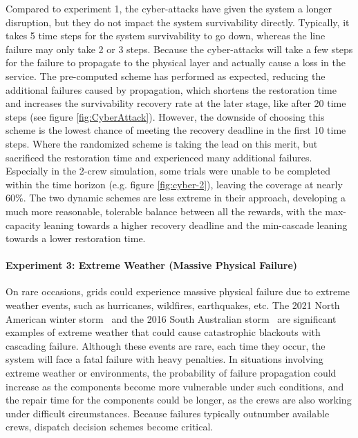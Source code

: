 \documentclass[conference]{IEEEtran}
\begin{document}
Compared to experiment 1, the cyber-attacks have given the system a longer disruption, but they do not impact the system survivability directly. Typically, it takes 5 time steps for the system survivability to go down, whereas the line failure may only take 2 or 3 steps. Because the cyber-attacks will take a few steps for the failure to propagate to the physical layer and actually cause a loss in the service. 
The pre-computed scheme has performed as expected, reducing the additional failures caused by propagation, which shortens the restoration time and increases the survivability recovery rate at the later stage, like after 20 time steps (see figure \ref{fig:CyberAttack}). However, the downside of choosing this scheme is the lowest chance of meeting the recovery deadline in the first 10 time steps. Where the randomized scheme is taking the lead on this merit, but sacrificed the restoration time and experienced many additional failures. Especially in the 2-crew simulation, some trials were unable to be completed within the time horizon (e.g. figure \ref{fig:cyber-2}), leaving the coverage at nearly 60\%. The two dynamic schemes are less extreme in their approach, developing a much more reasonable, tolerable balance between all the rewards, with the max-capacity leaning towards a higher recovery deadline and the min-cascade leaning towards a lower restoration time. \\

\paragraph{Experiment 3: Extreme Weather (Massive Physical Failure)}
On rare occasions, grids could experience massive physical failure due to extreme weather events, such as hurricanes, wildfires, earthquakes, etc. The 2021 North American winter storm~\cite{menati_preliminary_2021} and the 2016 South Australian storm~\cite{jamborsalamati_framework_2018} are significant examples of extreme weather that could cause catastrophic blackouts with cascading failure. Although these events are rare, each time they occur, the system will face a fatal failure with heavy penalties. In situations involving extreme weather or environments, the probability of failure propagation could increase as the components become more vulnerable under such conditions, and the repair time for the components could be longer, as the crews are also working under difficult circumstances. Because failures typically outnumber available crews, dispatch decision schemes become critical.
\end{document}
